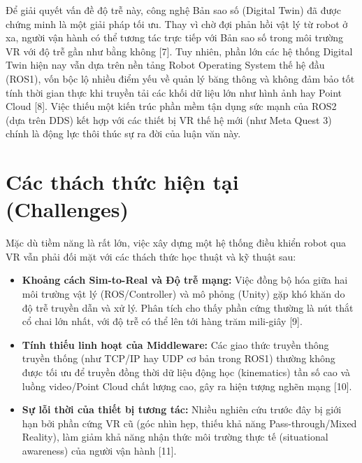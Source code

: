 Để giải quyết vấn đề độ trễ này, công nghệ Bản sao số (Digital Twin) đã được chứng minh là một giải pháp tối ưu. Thay vì chờ đợi phản hồi vật lý từ robot ở xa, người vận hành có thể tương tác trực tiếp với Bản sao số trong môi trường VR với độ trễ gần như bằng không \cite{autolab2021telesurgery} [7]. Tuy nhiên, phần lớn các hệ thống Digital Twin hiện nay vẫn dựa trên nền tảng Robot Operating System thế hệ đầu (ROS1), vốn bộc lộ nhiều điểm yếu về quản lý băng thông và không đảm bảo tốt tính thời gian thực khi truyền tải các khối dữ liệu lớn như hình ảnh hay Point Cloud \cite{kawshan2026digital} [8]. Việc thiếu một kiến trúc phần mềm tận dụng sức mạnh của ROS2 (dựa trên DDS) kết hợp với các thiết bị VR thế hệ mới (như Meta Quest 3) chính là động lực thôi thúc sự ra đời của luận văn này.

\section{Các thách thức hiện tại (Challenges)}
Mặc dù tiềm năng là rất lớn, việc xây dựng một hệ thống điều khiển robot qua VR vẫn phải đối mặt với các thách thức học thuật và kỹ thuật sau:
\begin{itemize}
    \item \textbf{Khoảng cách Sim-to-Real và Độ trễ mạng:} Việc đồng bộ hóa giữa hai môi trường vật lý (ROS/Controller) và mô phỏng (Unity) gặp khó khăn do độ trễ truyền dẫn và xử lý. Phân tích cho thấy phần cứng thường là nút thắt cổ chai lớn nhất, với độ trễ có thể lên tới hàng trăm mili-giây \cite{kawshan2026digital} [9].
    \item \textbf{Tính thiếu linh hoạt của Middleware:} Các giao thức truyền thông truyền thống (như TCP/IP hay UDP cơ bản trong ROS1) thường không được tối ưu để truyền đồng thời dữ liệu động học (kinematics) tần số cao và luồng video/Point Cloud chất lượng cao, gây ra hiện tượng nghẽn mạng \cite{luu2025enhancing} [10].
    \item \textbf{Sự lỗi thời của thiết bị tương tác:} Nhiều nghiên cứu trước đây bị giới hạn bởi phần cứng VR cũ (góc nhìn hẹp, thiếu khả năng Pass-through/Mixed Reality), làm giảm khả năng nhận thức môi trường thực tế (situational awareness) của người vận hành \cite{chen2023comparing} [11].
\end{itemize}

